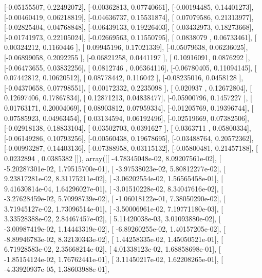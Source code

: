 \documentclass{article}
\begin{document}
       [-0.05155507,  0.22492072],
       [-0.00362813,  0.07740661],
       [-0.00194485,  0.14401273],
       [-0.00460419,  0.06218819],
       [-0.04636737,  0.15531874],
       [ 0.07079586,  0.21313977],
       [-0.02825404,  0.04768848],
       [-0.06439133,  0.19226403],
       [ 0.03432973,  0.18273668],
       [-0.01741973,  0.22105024],
       [-0.02669563,  0.11550795],
       [ 0.0838079 ,  0.06733461],
       [ 0.00324212,  0.1160446 ],
       [ 0.09945196,  0.17021339],
       [-0.05079638,  0.06236025],
       [-0.06899058,  0.2092255 ],
       [-0.06821258,  0.0441197 ],
       [ 0.10916091,  0.0876292 ],
       [-0.06473655,  0.03832256],
       [ 0.0812746 ,  0.06364116],
       [-0.06780405,  0.11094145],
       [ 0.07442812,  0.10620512],
       [ 0.08778442,  0.116042  ],
       [-0.08235016,  0.0458128 ],
       [-0.04370658,  0.07798551],
       [ 0.00172332,  0.2235098 ],
       [ 0.020937  ,  0.12672804],
       [ 0.12697406,  0.17867834],
       [ 0.12871213,  0.04838477],
       [-0.05900796,  0.1457227 ],
       [ 0.01763171,  0.20004069],
       [ 0.08903812,  0.07959334],
       [-0.01205769,  0.19396744],
       [ 0.07585923,  0.04963454],
       [ 0.03134594,  0.06192496],
       [-0.02519669,  0.07382506],
       [-0.02918138,  0.18833104],
       [ 0.03502703,  0.0391627 ],
       [ 0.0363711 ,  0.05800334],
       [-0.06149286,  0.10793256],
       [-0.00560438,  0.19678695],
       [-0.03488764,  0.20572362],
       [-0.00993287,  0.14403136],
       [-0.07388958,  0.03115132],
       [-0.05800481,  0.21457188],
       [ 0.0232894 ,  0.0385382 ]]), array([[ -4.78345048e-02,   8.09207561e-02],
       [ -5.20287301e-02,   1.79515700e-01],
       [ -3.97538023e-02,   5.80812277e-02],
       [  9.23817281e-02,   8.31175211e-02],
       [ -3.06202554e-02,   1.56565458e-01],
       [  9.41630814e-04,   1.64296027e-01],
       [ -3.01510228e-02,   8.34047616e-02],
       [ -3.27628459e-02,   5.70998739e-02],
       [ -1.06018122e-01,   7.38050290e-02],
       [  3.71945127e-02,   1.73096514e-01],
       [ -3.50006961e-02,   7.19771180e-03],
       [  3.33528388e-02,   2.84467457e-02],
       [  5.11420038e-03,   3.01093880e-02],
       [ -3.00987419e-02,   1.14443319e-02],
       [ -6.89260255e-02,   1.40157205e-02],
       [ -8.89946783e-02,   8.32130343e-02],
       [  1.44258335e-02,   1.45050521e-01],
       [  6.71928583e-02,   2.35668214e-02],
       [  4.01338123e-02,   1.68858698e-01],
       [ -1.85154124e-02,   1.76762441e-01],
       [  3.11450217e-02,   1.62208265e-01],
       [ -4.33920937e-05,   1.38603988e-01],
\end{document}
